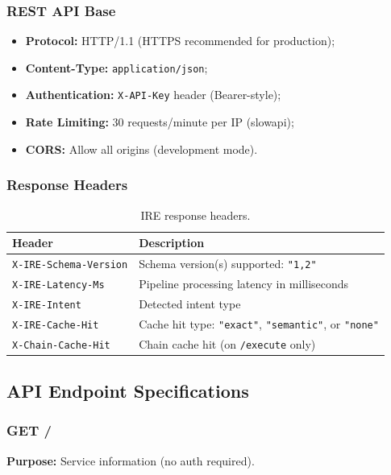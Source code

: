 \documentclass[10pt,journal,onecolumn]{IEEEtran}
\begin{document}
\subsubsection{REST API Base}
\begin{itemize}
\item \textbf{Protocol:} HTTP/1.1 (HTTPS recommended for production);
\item \textbf{Content-Type:} \texttt{application/json};
\item \textbf{Authentication:} \texttt{X-API-Key} header (Bearer-style);
\item \textbf{Rate Limiting:} 30 requests/minute per IP (slowapi);
\item \textbf{CORS:} Allow all origins (development mode).
\end{itemize}

\subsubsection{Response Headers}
\begin{table}[h]
\caption{IRE response headers.}
\label{tab:headers}
\begin{tabularx}{\columnwidth}{>{\ttfamily}l X}
\toprule
\textbf{Header} & \textbf{Description}\\
\midrule
\texttt{X-IRE-Schema-Version} & Schema version(s) supported: \texttt{"1,2"}\\
\texttt{X-IRE-Latency-Ms} & Pipeline processing latency in milliseconds\\
\texttt{X-IRE-Intent} & Detected intent type\\
\texttt{X-IRE-Cache-Hit} & Cache hit type: \texttt{"exact"}, \texttt{"semantic"}, or \texttt{"none"}\\
\texttt{X-Chain-Cache-Hit} & Chain cache hit (on \texttt{/execute} only)\\
\bottomrule
\end{tabularx}
\end{table}

\subsection{API Endpoint Specifications}

\subsubsection{GET /}
\textbf{Purpose:} Service information (no auth required).
\end{document}
